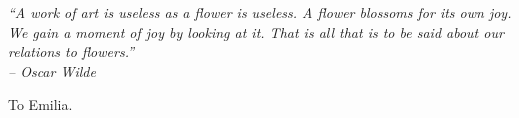 \begin{dedication}
\epigraph{\textit{
``A work of art is useless as a flower is useless.
A flower blossoms for its own joy.
We gain a moment of joy by looking at it.
That is all that is to be said about our relations to flowers.''\\
\vspace{0.5cm}
\textit{-- Oscar Wilde
}}}{}
\vspace{30mm}
To Emilia.
\end{dedication}

